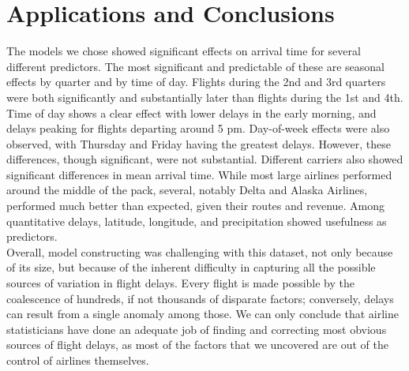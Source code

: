 \documentclass[12pt, a4paper, openany]{book}
\newcommand\tab[1][1cm]{\hspace*{#1}}
\begin{document}
	\section{Applications and Conclusions}

\tab The models we chose showed significant effects on arrival time for several different predictors. The most significant and predictable of these are seasonal effects by quarter and by time of day. Flights during the 2nd and 3rd quarters were both significantly and substantially later than flights during the 1st and 4th. Time of day shows a clear effect with lower delays in the early morning, and delays peaking for flights departing around 5 pm. Day-of-week effects were also observed, with Thursday and Friday having the greatest delays. However, these differences, though significant, were not substantial. Different carriers also showed significant differences in mean arrival time. While most large airlines performed around the middle of the pack, several, notably Delta and Alaska Airlines, performed much better than expected, given their routes and revenue. Among quantitative delays, latitude, longitude, and precipitation showed usefulness as predictors.\\
\tab Overall, model constructing was challenging with this dataset, not only because of its size, but because of the inherent difficulty in capturing all the possible sources of variation in flight delays. Every flight is made possible by the coalescence of hundreds, if not thousands of disparate factors; conversely, delays can result from a single anomaly among those. We can only conclude that airline statisticians have done an adequate job of finding and correcting most obvious sources of flight delays, as most of the factors that we uncovered are out of the control of airlines themselves. 
\end{document}
